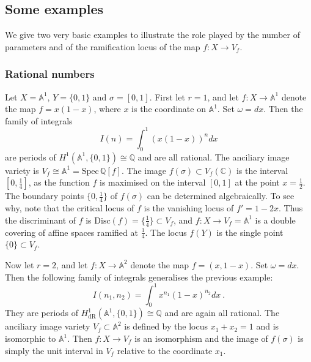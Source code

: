 \documentclass[a4paper,10pt]{amsart}
\theoremstyle{definition}
\theoremstyle{remark}
\numberwithin{equation}{section}
\newcommand{\Q}{\mathbb Q}
\newcommand{\C}{\mathbb C}
\newcommand{\note}[1]{{\color{blue}   #1}}
\newcommand{\0}{\color{blue}{\mathsf{0}}}
\begin{document}
%

\subsection{Some examples}  We give two very basic examples to illustrate the role  played by  the number of parameters  and of the ramification locus of the map $f: X \rightarrow V_f$.

\subsubsection{Rational numbers} Let  $X= \mathbb{A}^1$, $Y=\{0,1\}$ and $\sigma = [0,1]$. 
First let $r=1$,  and  let $f: X \rightarrow \mathbb{A}^1$ denote the map $f=x(1-x)$, where $x$  is the coordinate on   $\mathbb{A}^1$. 
 Set $\omega = dx$.  Then 
the family of integrals 
\[  I(n) =  \int_{0}^1  \left(x(1-x)\right)^n dx\]
are periods of $H^1(\mathbb{A}^1, \{0,1\})\cong \Q$  and are all rational. 
The anciliary image variety is  $V_f \cong  \mathbb{A}^1= \mathrm{Spec}\,  \Q[f]$. 
 The image  $f(\sigma) \subset V_f(\C)$ is the interval $[0,\frac{1}{4}]$, as the function $f$ is maximised on the interval $[0,1]$ at the point $x=\frac{1}{2}.$
The boundary points $\{0,\frac{1}{4}\}$ of  $f(\sigma)$ can be   
 determined algebraically. To see why, note that 
the critical locus of $f$ is the  vanishing locus of $f' = 1-2x$. Thus the discriminant of $f$ is
$\mathrm{Disc}(f) = \{ \frac{1}{4}\} \subset V_f$, and 
$f: X \rightarrow V_f = \mathbb{A}^1$ is a double covering of affine spaces  ramified at $\frac{1}{4}$. 
The locus $f(Y)$ is the single point  $\{0\} \subset V_f$.


Now let $r=2$,   and  let $f: X \rightarrow \mathbb{A}^2$ denote the map $f=(x,1-x)$.
Set $\omega = dx$. Then 
the following family of integrals generalises the previous example:
\[  I(n_1,n_2) =  \int_{0}^1     x^{n_1} (1-x)^{n_2}  dx \ . \]
They are  periods of $H^1_{\mathrm{dR}}(\mathbb{A}^1, \{0,1\}) \cong \Q$ and are again all rational.
The anciliary image variety  $V_f  \subset \mathbb{A}^2$ is defined by the locus $x_1+x_2 =1$ and is isomorphic to $\mathbb{A}^1$. Then $f: X\rightarrow V_f$ is an isomorphism and the image of $f(\sigma)$ is simply the unit interval in $V_f$ relative to the coordinate $x_1$. 
\end{document}
